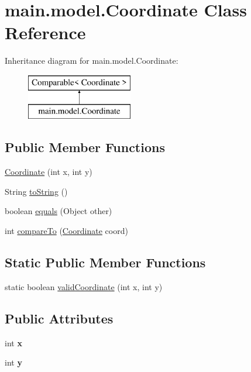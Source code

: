 \hypertarget{classmain_1_1model_1_1_coordinate}{}\section{main.\+model.\+Coordinate Class Reference}
\label{classmain_1_1model_1_1_coordinate}
Inheritance diagram for main.\+model.\+Coordinate\+:\begin{figure}[H]
\begin{center}
\leavevmode
\includegraphics[height=2.000000cm]{classmain_1_1model_1_1_coordinate}
\end{center}
\end{figure}
\subsection*{Public Member Functions}
\begin{DoxyCompactItemize}
\item 
\hyperlink{classmain_1_1model_1_1_coordinate_adf838f26901635ae28525143e21c1263}{Coordinate} (int x, int y)
\item 
String \hyperlink{classmain_1_1model_1_1_coordinate_abf2f4212b8c3dd47c5cbc735935733f3}{to\+String} ()
\item 
boolean \hyperlink{classmain_1_1model_1_1_coordinate_a1e984b946ab806ab6921358700dc4619}{equals} (Object other)
\item 
int \hyperlink{classmain_1_1model_1_1_coordinate_ae3d33c4d690428f5daadea5380cf801a}{compare\+To} (\hyperlink{classmain_1_1model_1_1_coordinate}{Coordinate} coord)
\end{DoxyCompactItemize}
\subsection*{Static Public Member Functions}
\begin{DoxyCompactItemize}
\item 
static boolean \hyperlink{classmain_1_1model_1_1_coordinate_a438e61b11e63eb9522f754e84ecbee40}{valid\+Coordinate} (int x, int y)
\end{DoxyCompactItemize}
\subsection*{Public Attributes}
\begin{DoxyCompactItemize}
\item 
\hypertarget{classmain_1_1model_1_1_coordinate_a37010d49275f09df78e0f5d8ffefea31}{}\label{classmain_1_1model_1_1_coordinate_a37010d49275f09df78e0f5d8ffefea31} 
int {\bfseries x}
\item 
\hypertarget{classmain_1_1model_1_1_coordinate_a41308ad939f7cba09484c17abef5ea62}{}\label{classmain_1_1model_1_1_coordinate_a41308ad939f7cba09484c17abef5ea62} 
int {\bfseries y}
\end{DoxyCompactItemize}


